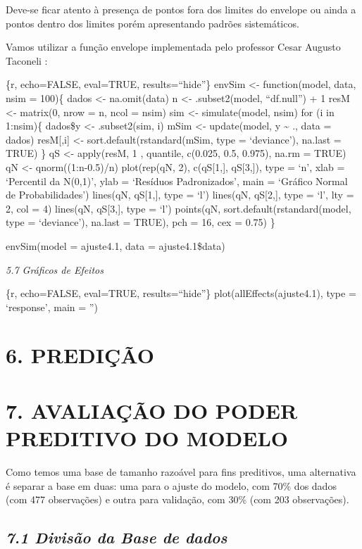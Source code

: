 \documentclass[]{article}
\begin{document}
Deve-se ficar atento à presença de pontos fora dos limites do envelope
ou ainda a pontos dentro dos limites porém apresentando padrões
sistemáticos.

Vamos utilizar a função envelope implementada pelo professor Cesar
Augusto Taconeli :

\{r, echo=FALSE, eval=TRUE, results=``hide''\} envSim \textless{}-
function(model, data, nsim = 100)\{ dados \textless{}- na.omit(data) n
\textless{}- .subset2(model, ``df.null'') + 1 resM \textless{}-
matrix(0, nrow = n, ncol = nsim) sim \textless{}- simulate(model, nsim)
for (i in 1:nsim)\{ dados\$y \textless{}- .subset2(sim, i) mSim
\textless{}- update(model, y \textasciitilde{} ., data = dados)
resM{[},i{]} \textless{}- sort.default(rstandard(mSim, type =
`deviance'), na.last = TRUE) \} qS \textless{}- apply(resM, 1 ,
quantile, c(0.025, 0.5, 0.975), na.rm = TRUE) qN \textless{}-
qnorm((1:n-0.5)/n) plot(rep(qN, 2), c(qS{[}1,{]}, qS{[}3,{]}), type =
`n', xlab = `Percentil da N(0,1)', ylab = `Resíduos Padronizados', main
= `Gráfico Normal de Probabilidades') lines(qN, qS{[}1,{]}, type = `l')
lines(qN, qS{[}2,{]}, type = `l', lty = 2, col = 4) lines(qN,
qS{[}3,{]}, type = `l') points(qN, sort.default(rstandard(model, type =
`deviance'), na.last = TRUE), pch = 16, cex = 0.75) \}

envSim(model = ajuste4.1, data = ajuste4.1\$data)

\emph{5.7 Gráficos de Efeitos}

\{r, echo=FALSE, eval=TRUE, results=``hide''\}
plot(allEffects(ajuste4.1), type = `response', main = '')

\section{6. PREDIÇÃO}\label{predicao}

\section{7. AVALIAÇÃO DO PODER PREDITIVO DO
MODELO}\label{avaliacao-do-poder-preditivo-do-modelo}

Como temos uma base de tamanho razoável para fins preditivos, uma
alternativa é separar a base em duas: uma para o ajuste do modelo, com
70\% dos dados (com 477 observações) e outra para validação, com 30\%
(com 203 observações).

\subsection{\texorpdfstring{\emph{7.1 Divisão da Base de
dados}}{7.1 Divisão da Base de dados}}\label{divisao-da-base-de-dados}
\end{document}
